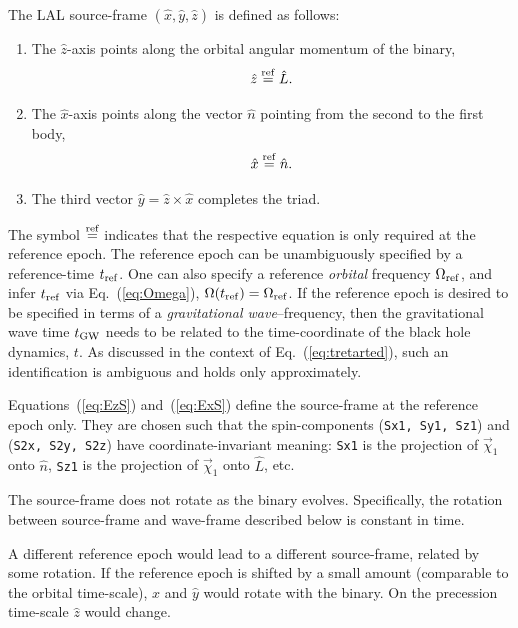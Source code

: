 \documentclass[aps,prd,amssymb,amsmath,amsfonts,superscriptaddress,
floatfix ,preprintnumbers,altaffilletter]{revtex4}
\newcommand{\nNR}{\hat{n}}
\newcommand{\lNR}{\hat L}
\newcommand{\tGW}{t_{\rm GW}}
\newcommand{\ExS}{{{\hat x}}}
\newcommand{\EyS}{{{\hat y}}}
\newcommand{\EzS}{{{\hat z}}}
\newcommand{\phiRef}{\Phi} %
\newcommand{\equalref}{\overset{\rm ref}{=}}
\begin{document}
The LAL source-frame $(\ExS, \EyS, \EzS)$ is defined as follows:
\begin{enumerate}
\item The $\EzS$-axis points along the orbital angular momentum of the binary,
  \begin{equation}\label{eq:EzS}
    \EzS\equalref \lNR.
  \end{equation}
\item The $\ExS$-axis points along the vector $\nNR$ pointing from the second
  to the first body,
  \begin{equation}\label{eq:ExS}
    \ExS\equalref\nNR.
  \end{equation}
\item The third vector $\EyS=\EzS\times\ExS$ completes the triad.
\end{enumerate}
The symbol $\equalref$ indicates that the
respective equation is only required at the reference epoch.  The
reference epoch can be unambiguously specified by a reference-time
$t_{\rm ref}$.  One can also specify a reference \emph{orbital}
frequency $\Omega_{\rm ref}$, and infer $t_{\rm ref}$ via
Eq.~(\ref{eq:Omega}), $\Omega(t_{\rm ref})=\Omega_{\rm ref}$.  If the
reference epoch is desired to be specified in terms of a
\emph{gravitational wave}--frequency, then the gravitational wave time
$\tGW$ needs to be related to the time-coordinate of the black hole
dynamics, $t$.  As discussed in the context of
Eq.~(\ref{eq:tretarted}), such an identification is ambiguous and
holds only approximately.

Equations~(\ref{eq:EzS}) and~(\ref{eq:ExS}) define the source-frame at
the reference epoch only.  They are chosen such that the
spin-components ({\tt Sx1, Sy1, Sz1}) and ({\tt S2x, S2y, S2z}) have
coordinate-invariant meaning: {\tt Sx1} is the projection of
$\vec\chi_1$ onto $\nNR$, {\tt Sz1} is the projection of $\vec\chi_1$
onto $\lNR$, etc.

The source-frame does not rotate as the binary evolves.  Specifically,
the rotation between source-frame and wave-frame described below is
constant in time.

A different reference epoch would lead to a different source-frame,
related by some rotation.  If the reference epoch is shifted by a
small amount (comparable to the orbital time-scale), $\ExS$ and $\EyS$
would rotate with the binary.  On the precession time-scale $\EzS$
would change.
\end{document}
